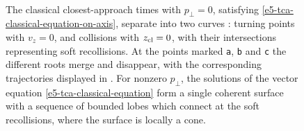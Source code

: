 \begin{figure}[t!h]
\centering
  \\
  \caption[
  Classical closest-approach times, both on-axis at $p_\perp=0$ and as a cusped surface in $\{(\vbp,t)\}$ space
  ]{
  The classical closest-approach times with $p_\perp=0$, satisfying \eqref{e5-tca-classical-equation-on-axis}, separate into two curves  \protect{}: turning points with $v_z=0$, and collisions with $z_{\mathrm{cl}}=0$, with their intersections representing soft recollisions. At the points marked \texttt{a}, \texttt{b} and \texttt{c} the different roots merge and disappear, with the corresponding trajectories displayed in .
  For nonzero $p_\perp$, the solutions of the vector equation \eqref{e5-tca-classical-equation} form a single coherent surface \protect{} with a sequence of bounded lobes which connect at the soft recollisions, where the surface is locally a cone.
}
\end{figure}
